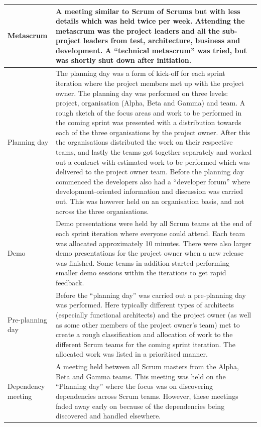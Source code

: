 \begin{center}
\begin{longtable}{| p{6cm} | p{9cm} |}
    Metascrum & A meeting similar to Scrum of Scrums but with less details which was held twice per week. Attending the metascrum was the project leaders and all the sub-project leaders from test, architecture, business and development. A ``technical metascrum'' was tried, but was shortly shut down after initiation. \\ \hline
    Planning day & The planning day was a form of kick-off for each sprint iteration where the project members met up with the project owner. The planning day was performed on three levels: project, organisation (Alpha, Beta and Gamma) and team. A rough sketch of the focus areas and work to be performed in the coming sprint was presented with a distribution towards each of the three organisations by the project owner. After this the organisations distributed the work on their respective teams, and lastly the teams got together separately and worked out a contract with estimated work to be performed which was delivered to the project owner team. Before the planning day commenced the developers also had a ``developer forum'' where development-oriented information and discussion was carried out. This was however held on an organisation basis, and not across the three organisations. \\ \hline
    Demo & Demo presentations were held by all Scrum teams at the end of each sprint iteration where everyone could attend. Each team was allocated approximately 10 minutes. There were also larger demo presentations for the project owner when a new release was finished. Some teams in addition started performing smaller demo sessions within the iterations to get rapid feedback. \\ \hline
    Pre-planning day & Before the ``planning day'' was carried out a pre-planning day was performed. Here typically different types of architects (especially functional architects) and the project owner (as well as some other members of the project owner's team) met to create a rough classification and allocation of work to the different Scrum teams for the coming sprint iteration. The allocated work was listed in a prioritised manner. \\ \hline
    Dependency meeting & A meeting held between all Scrum masters from the Alpha, Beta and Gamma teams. This meeting was held on the ``Planning day'' where the focus was on discovering dependencies across Scrum teams. However, these meetings faded away early on because of the dependencies being discovered and handled elsewhere. \\ \hline

\end{longtable}
\end{center}
